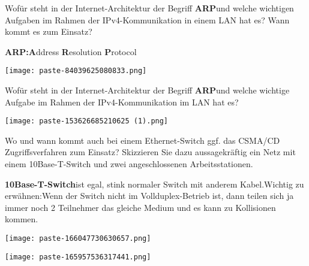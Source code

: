 \documentclass{article}
\begin{document}
\begin{tcolorbox}[colback=white!10!white,colframe=lightgray!75!black,
  savelowerto=\jobname_ex.tex,breakable,enhanced,lines before break=40]

\justifying
Wofür steht in der Internet-Architektur der Begriff \textbf{ARP}und welche wichtigen Aufgaben im Rahmen der IPv4-Kommunikation in einem LAN hat es? Wann kommt es zum Einsatz?

\tcblower

\justifying
\textbf{ARP:}\textbf{A}ddress \textbf{R}esolution \textbf{P}rotocol\begin{center}
\texttt{[image: paste-84039625080833.png]}
\end{center}

\end{tcolorbox}
\begin{tcolorbox}[colback=white!10!white,colframe=lightgray!75!black,
  savelowerto=\jobname_ex.tex,breakable,enhanced,lines before break=40]

\justifying
Wofür steht in der Internet-Architektur der Begriff \textbf{ARP}und welche wichtige Aufgabe im Rahmen der IPv4-Kommunikation im LAN hat es?

\tcblower

\justifying
\begin{center}
\texttt{[image: paste-153626685210625 (1).png]}
\end{center}

\end{tcolorbox}
\begin{tcolorbox}[colback=white!10!white,colframe=lightgray!75!black,
  savelowerto=\jobname_ex.tex,breakable,enhanced,lines before break=40]

\justifying
Wo und wann kommt auch bei einem Ethernet-Switch ggf. das CSMA/CD Zugriffsverfahren zum Einsatz? Skizzieren Sie dazu aussagekräftig ein Netz mit einem 10Base-T-Switch und zwei angeschlossenen Arbeitsstationen.

\tcblower

\justifying
\textbf{10Base-T-Switch}ist egal, stink normaler Switch mit anderem Kabel.Wichtig zu erwähnen:Wenn der Switch nicht im Vollduplex-Betrieb ist, dann teilen sich ja immer noch 2 Teilnehmer das gleiche Medium und es kann zu Kollisionen kommen.\begin{center}
\texttt{[image: paste-166047730630657.png]}
\end{center}
\begin{center}
\texttt{[image: paste-165957536317441.png]}
\end{center}

\end{tcolorbox}
\end{document}
